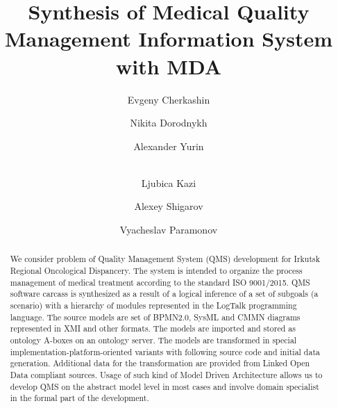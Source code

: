 \documentclass{llncs}
\begin{document}
\title{Synthesis of Medical Quality Management Information System with MDA}


\author{Evgeny Cherkashin\and
Nikita Dorodnykh\and
Alexander Yurin\and\\
Ljubica Kazi\and
Alexey Shigarov\and
Vyacheslav Paramonov
}




\maketitle

\begin{abstract} %
We consider problem of Quality Management System (QMS) development for Irkutsk Regional Oncological Dispancery.  The system is intended to organize the process management of medical treatment according to the standard ISO 9001/2015.  QMS software carcass is synthesized as a result of a logical inference of a set of subgoals (a scenario) with a hierarchy of modules represented in the LogTalk programming language.  The source models are set of BPMN2.0, SysML and CMMN diagrams represented in XMI and other formats.  The models are imported and stored as ontology A-boxes on an ontology server.  The models are transformed in special implementation-platform-oriented variants with following source code and initial data generation.  Additional data for the transformation are provided from Linked Open Data compliant sources.  Usage of such kind of Model Driven Architecture allows us to develop QMS on the abstract model level in most cases and involve domain specialist in the formal part of the development.


\end{abstract}
\end{document}
